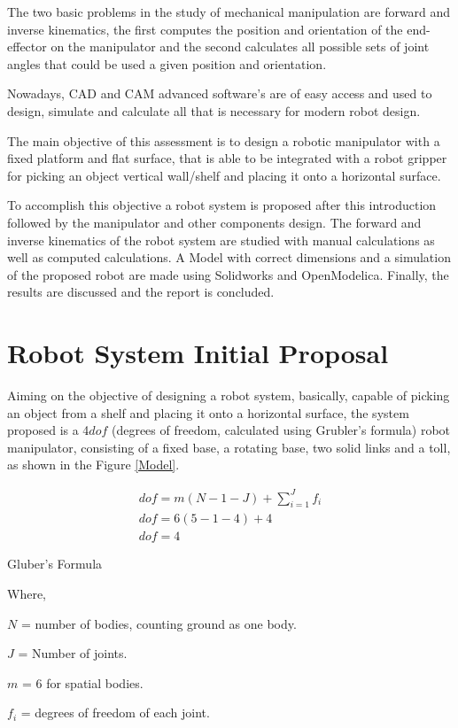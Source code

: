 \documentclass[transmag]{IEEEtran}
\begin{document}
The two basic problems in the study of mechanical manipulation are forward and inverse kinematics, the first computes the position and orientation of the end-effector on the manipulator and the second calculates all possible sets of joint angles that could be used  a given position and orientation. 

Nowadays, CAD and CAM advanced software's are of easy access and used to design, simulate and calculate all that is necessary for modern robot design.

The main objective of this assessment is to design a robotic manipulator with a fixed platform and flat surface, that is able to be integrated with a robot gripper for picking an object vertical wall/shelf and placing it onto a horizontal surface. 

To accomplish this objective a robot system is proposed after this introduction followed by the manipulator and other components design. The forward and inverse kinematics of the robot system are studied with manual calculations as well as computed calculations. A Model with correct dimensions and a simulation of the proposed robot are made using Solidworks and OpenModelica. Finally, the results are discussed and the report is concluded.






 

\section{Robot System Initial Proposal}

Aiming on the objective of designing a robot system, basically, capable of picking an object from a shelf and placing it onto a horizontal surface, the system proposed is a 4$dof$ (degrees of freedom, calculated using Grubler's formula) robot manipulator, consisting of a fixed base, a rotating base, two solid links and a toll, as shown in the Figure \ref{Model}.

\begin{eqfloat}
\begin{equation}
\begin{matrix}
dof = m(N-1-J) + \sum_{i=1}^{J} f_i \\
dof = 6(5-1-4) + 4 \\
dof = 4 
\end{matrix}
\end{equation}
\begin{center}
Gluber's Formula
\end{center}
Where,

$N$ = number of bodies, counting ground as one body.

$J$ = Number of joints.

$m$ = 6 for spatial bodies.

$f_i$ = degrees of freedom of each joint.
\end{eqfloat}
\end{document}

